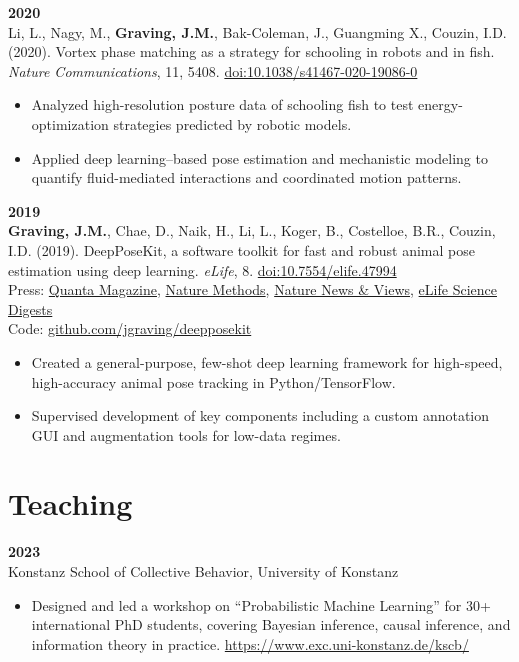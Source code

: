 \documentclass[10pt,letterpaper]{article}
\begin{document}
	\vspace{4pt}
	\textbf{2020}\\
	Li, L., Nagy, M., \textbf{Graving, J.M.}, Bak-Coleman, J., Guangming X., Couzin, I.D. (2020). Vortex phase matching as a strategy for schooling in robots and in fish. \textit{Nature Communications}, 11, 5408. \href{https://doi.org/10.1038/s41467-020-19086-0}{doi:10.1038/s41467-020-19086-0}
	\begin{itemize}
		\item Analyzed high-resolution posture data of schooling fish to test energy-optimization strategies predicted by robotic models.
		\item Applied deep learning–based pose estimation and mechanistic modeling to quantify fluid-mediated interactions and coordinated motion patterns.
	\end{itemize}
	
	\vspace{4pt}
	\textbf{2019}\\
	\textbf{Graving, J.M.}, Chae, D., Naik, H., Li, L., Koger, B., Costelloe, B.R., Couzin, I.D. (2019). DeepPoseKit, a software toolkit for fast and robust animal pose estimation using deep learning. \textit{eLife}, 8. \href{https://doi.org/10.7554/elife.47994}{doi:10.7554/elife.47994} \\
	Press: \href{https://www.quantamagazine.org/to-decode-the-brain-scientists-automate-the-study-of-behavior-20191210/}{Quanta Magazine}, 
	\href{https://doi.org/10.1038/s41592-019-0678-2}{Nature Methods},
	\href{https://doi.org/10.1038/d41586-019-02942-5}{Nature News \& Views},
	\href{https://elifesciences.org/digests/47994/machine-learning-animal-poses-to-understand-behavior}{eLife Science Digests} \\
	Code: \href{https://github.com/jgraving/deepposekit}{github.com/jgraving/deepposekit}
	\begin{itemize}
		\item Created a general-purpose, few-shot deep learning framework for high-speed, high-accuracy animal pose tracking in Python/TensorFlow.
		\item Supervised development of key components including a custom annotation GUI and augmentation tools for low-data regimes.
	\end{itemize}
	
	\section*{Teaching}
	\textbf{2023}\\
	Konstanz School of Collective Behavior, University of Konstanz
	\begin{itemize}
		\item Designed and led a workshop on “Probabilistic Machine Learning” for 30+ international PhD students, covering Bayesian inference, causal inference, and information theory in practice. \href{https://www.exc.uni-konstanz.de/kscb/}{https://www.exc.uni-konstanz.de/kscb/}
	\end{itemize}
	
\end{document}
